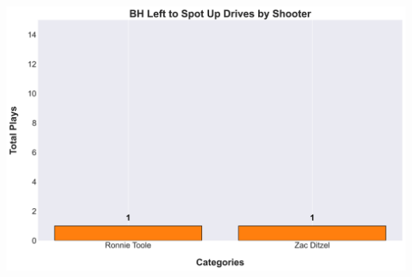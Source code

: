 \documentclass[a4paper,12pt]{article}
\begin{document}
\begin{table}[H]
{\begin{minipage}[t]{0.6\textwidth}
{\begin{tabular}
                
            
                
            
                
            
                
            
                
            
                
            
                
            
                
            

            \bottomrule
        \end{tabular}
        } %
    \end{minipage}
    } %
    \hfill %
    \begin{minipage}[c]{0.35\textwidth} %
        \flushright
        \includegraphics[width=\textwidth, height=.14\textheight]{images/PNR_PassLeftDrivesPlayer_Freq.png} %
    \end{minipage}
\end{table}

\vspace{-1em} %
\vspace{-1em} %
\end{document}
